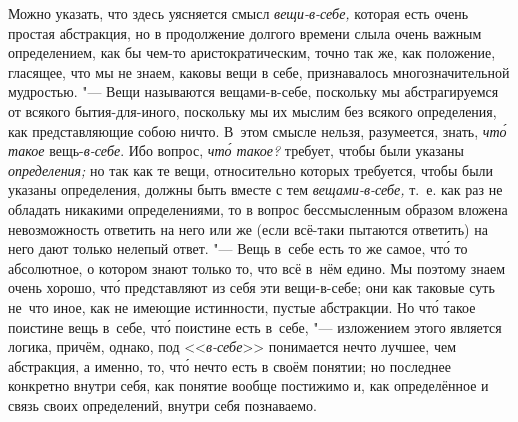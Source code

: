 Можно указать, что здесь уясняется смысл
{\em вещи-в-себе,} которая есть очень простая
абстракция, но в продолжение долгого времени слыла очень важным
определением, как бы чем-то аристократическим, точно так же, как положение,
гласящее, что мы не знаем, каковы вещи в себе, признавалось
многозначительной мудростью. "--- Вещи называются вещами-в-себе, поскольку мы
абстрагируемся от всякого бытия-для-иного, поскольку мы их мыслим без
всякого определения, как представляющие собою ничто. В~этом смысле нельзя,
разумеется, знать, {\em чт\'{о} такое}
вещь-{\em в-себе}. Ибо вопрос,
{\em чт\'{о} такое?} требует, чтобы были указаны
{\em определения;} но так как те вещи, относительно
которых требуется, чтобы были указаны определения, должны быть вместе с тем
{\em вещами-в-себе,} т.~е. как раз не обладать никакими
определениями, то в вопрос бессмысленным образом вложена невозможность
ответить на него или же (если всё-таки пытаются ответить) на него дают только
нелепый ответ. "--- Вещь в~себе есть то же самое, чт\'{о} то абсолютное,
о котором знают только то, что всё в~нём едино. Мы поэтому знаем очень
хорошо, чт\'{о} представляют из себя эти вещи-в-себе; они как таковые суть
не~что иное, как не имеющие истинности, пустые абстракции. Но чт\'{о} такое
поистине вещь в~себе, чт\'{о} поистине есть в~себе, "--- изложением этого
является логика, причём, однако, под <<{\em в-себе}>> понимается нечто
лучшее, чем абстракция, а именно, то, чт\'{о} нечто есть в своём понятии;
но последнее конкретно внутри себя, как понятие вообще постижимо и, как
определённое и связь своих определений, внутри себя познаваемо.

